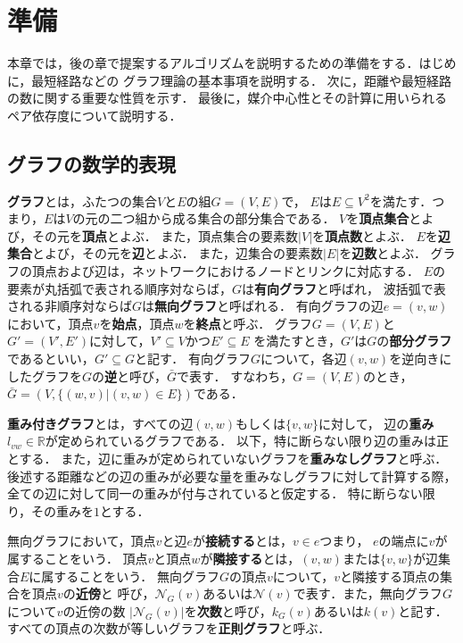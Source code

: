 \chapter{準備}
\label{chap:preliminary}
本章では，後の章で提案するアルゴリズムを説明するための準備をする．はじめに，最短経路などの
グラフ理論の基本事項を説明する．
次に，距離や最短経路の数に関する重要な性質を示す．
最後に，媒介中心性とその計算に用いられるペア依存度について説明する．

\section{グラフの数学的表現}
\label{sect:graph-theory}

\textbf{グラフ}とは，ふたつの集合$V$と$E$の組$G=(V,E)$で，
$E$は$E\subseteq V^2$を満たす．つまり，$E$は$V$の元の二つ組から成る集合の部分集合である．
$V$を\textbf{頂点集合}とよび，その元を\textbf{頂点}とよぶ．
また，頂点集合の要素数$|V|$を\textbf{頂点数}とよぶ．
$E$を\textbf{辺集合}とよび，その元を\textbf{辺}とよぶ．
また，辺集合の要素数$|E|$を\textbf{辺数}とよぶ．
グラフの頂点および辺は，ネットワークにおけるノードとリンクに対応する．
$E$の要素が丸括弧で表される順序対ならば，$G$は\textbf{有向グラフ}と呼ばれ，
波括弧で表される非順序対ならば$G$は\textbf{無向グラフ}と呼ばれる．
有向グラフの辺$e=(v,w)$において，頂点$v$を\textbf{始点}，頂点$w$を\textbf{終点}と呼ぶ．
グラフ$G=(V,E)$と$G'=(V',E')$に対して，$V'\subseteq V$かつ$E'\subseteq E$
を満たすとき，$G'$は$G$の\textbf{部分グラフ}であるといい，$G'\subseteq G$と記す．
有向グラフ$G$について，各辺$(v,w)$を逆向きにしたグラフを$G$の\textbf{逆}と呼び，$\bar{G}$で表す．
すなわち，$G=(V,E)$のとき，$\bar{G}=(V,\{(w,v)|(v,w)\in E\})$である．

\textbf{重み付きグラフ}とは，すべての辺$(v,w)$もしくは$\{v,w\}$に対して，
辺の\textbf{重み}$l_{vw}\in\mathbb{R}$が定められているグラフである．
以下，特に断らない限り辺の重みは正とする．
また，辺に重みが定められていないグラフを\textbf{重みなしグラフ}と呼ぶ．
後述する距離などの辺の重みが必要な量を重みなしグラフに対して計算する際，
全ての辺に対して同一の重みが付与されていると仮定する．
特に断らない限り，その重みを$1$とする．

無向グラフにおいて，頂点$v$と辺$e$が\textbf{接続する}とは，$v\in e$つまり，
$e$の端点に$v$が属することをいう．
頂点$v$と頂点$w$が\textbf{隣接する}とは，$(v,w)$または$\{v,w\}$が辺集合$E$に属することをいう．
無向グラフ$G$の頂点$v$について，$v$と隣接する頂点の集合を頂点$v$の\textbf{近傍}と
呼び，$\mathcal{N}_G(v)$あるいは$\mathcal{N}(v)$で表す．また，無向グラフ$G$について$v$の近傍の数
$|\mathcal{N}_G(v)|$を\textbf{次数}と呼び，$k_G(v)$あるいは$k(v)$と記す．
すべての頂点の次数が等しいグラフを\textbf{正則グラフ}と呼ぶ．

